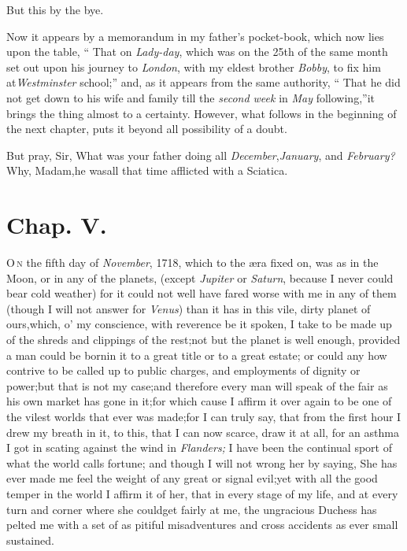 \documentclass{article}
\begin{document}
\vspace{-6pt}
But this by the bye.

\newpage
Now it appears by a memorandum in my father’s pocket-book, which now lies upon
the table, “ That on \textit{Lady-day}, which was on the 25th of
the same month 
set out upon his journey to \textit{London}, with my eldest brother
\textit{Bobby}, to fix him at\break\textit{Westminster} school;” and,
as it appears from the same authority, “ That he did not get
down to his wife and family till the \textit{second week} in
\textit{May} following,”\tsk  it brings the thing almost to a
certainty.\break
However, what follows in the beginning of the next
chapter, puts it beyond all possibility of a doubt.

\tsh  But pray, Sir, What was your father doing
all \textit{December},\tsk\textit{January}, and
\textit{February?}\tsh  Why, Madam,\tsk  he was\break all that
time afflicted with a Sciatica.

\section{Chap. V.}

\lettrine{O}{\,n} the fifth day of \textit{November},
1718, which to the æra fixed on, was as\break 
{} 
\break
{}
in the Moon, or in any of the
planets, (except \textit{Jupiter} or \textit{Saturn}, because I never
could bear cold weather) for it could not well have fared worse
with me in any of them (though I will not answer for \textit{Venus})
than it has in this vile, dirty planet of ours,\tsk  which,
o’ my conscience, with reverence be it spoken, I take to be
made up of the shreds and clippings of the rest;\tsh  not
but the planet is well enough, provided a man could be born\pb in it
to a great title or to a great estate; or could any how contrive to
be called up to public charges, and employments of dignity or
power;\tsh  but that is not my case;\tsh  and
therefore every man will speak of the fair as his own market has
gone in it;\tsk  for which cause I affirm it over
again to be one of the vilest worlds that ever was made;\tsk  for
I can truly say, that from the first hour I drew my breath in it,
to this, that I can now scarce, draw it at all, for an asthma I got
in scating against the wind in \textit{Flanders;}\tsk\break
I have been the continual sport of what the world calls fortune; and though I will
not wrong her by saying, She has ever made me feel the weight of any great or signal
evil;\tsk  yet with all the good temper in the world I affirm it of her, that in
every stage of my life, and at every turn and corner where she could\pb get fairly
at me, the ungracious Duchess has pelted me with a set of as pitiful misadventures
and cross accidents as ever small  sustained.
\end{document}
